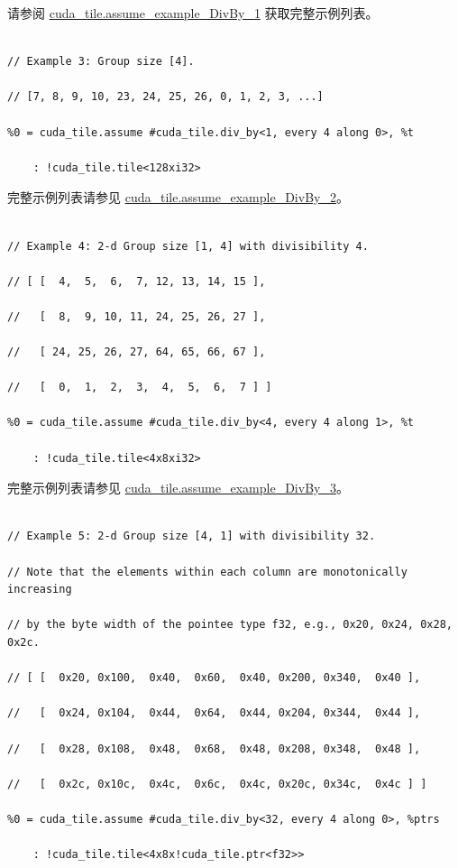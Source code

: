 \documentclass{article}
\begin{document}
请参阅 \href{https://docs.nvidia.com/cuda/tile-ir/latest/sections/appendix.html#example-cuda-tile-assume-example-divby-1}{cuda\_tile.assume\_example\_DivBy\_1} 获取完整示例列表。



\begin{lstlisting}

// Example 3: Group size [4].

// [7, 8, 9, 10, 23, 24, 25, 26, 0, 1, 2, 3, ...]

%0 = cuda_tile.assume #cuda_tile.div_by<1, every 4 along 0>, %t

    : !cuda_tile.tile<128xi32>

\end{lstlisting}



完整示例列表请参见 \href{https://docs.nvidia.com/cuda/tile-ir/latest/sections/appendix.html#example-cuda-tile-assume-example-divby-2}{cuda\_tile.assume\_example\_DivBy\_2}。



\begin{lstlisting}

// Example 4: 2-d Group size [1, 4] with divisibility 4.

// [ [  4,  5,  6,  7, 12, 13, 14, 15 ],

//   [  8,  9, 10, 11, 24, 25, 26, 27 ],

//   [ 24, 25, 26, 27, 64, 65, 66, 67 ],

//   [  0,  1,  2,  3,  4,  5,  6,  7 ] ]

%0 = cuda_tile.assume #cuda_tile.div_by<4, every 4 along 1>, %t

    : !cuda_tile.tile<4x8xi32>

\end{lstlisting}



完整示例列表请参见 \href{https://docs.nvidia.com/cuda/tile-ir/latest/sections/appendix.html#example-cuda-tile-assume-example-divby-3}{cuda\_tile.assume\_example\_DivBy\_3}。



\begin{lstlisting}

// Example 5: 2-d Group size [4, 1] with divisibility 32.

// Note that the elements within each column are monotonically increasing

// by the byte width of the pointee type f32, e.g., 0x20, 0x24, 0x28, 0x2c.

// [ [  0x20, 0x100,  0x40,  0x60,  0x40, 0x200, 0x340,  0x40 ],

//   [  0x24, 0x104,  0x44,  0x64,  0x44, 0x204, 0x344,  0x44 ],

//   [  0x28, 0x108,  0x48,  0x68,  0x48, 0x208, 0x348,  0x48 ],

//   [  0x2c, 0x10c,  0x4c,  0x6c,  0x4c, 0x20c, 0x34c,  0x4c ] ]

%0 = cuda_tile.assume #cuda_tile.div_by<32, every 4 along 0>, %ptrs

    : !cuda_tile.tile<4x8x!cuda_tile.ptr<f32>>

\end{lstlisting}
\end{document}
